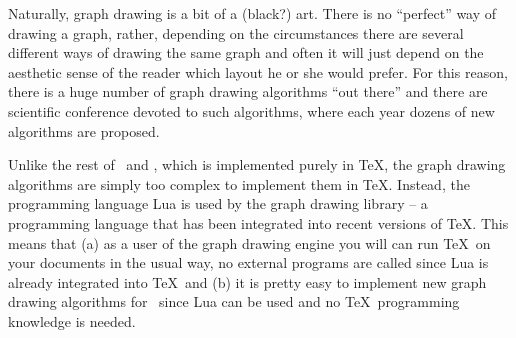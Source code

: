 Naturally, graph drawing is a bit of a (black?) art. There is no
``perfect'' way of drawing a graph, rather, depending on the
circumstances there are several different ways of drawing the same
graph and often it will just depend on the aesthetic sense of the
reader which layout he or she would prefer. For this reason, there is
a huge number of graph drawing algorithms ``out there'' and there are
scientific conference devoted to such algorithms, where each
year dozens of new algorithms are proposed.

Unlike the rest of \pgfname\ and \tikzname, which is implemented
purely in \TeX, the graph drawing algorithms are simply too complex to
implement them in \TeX. Instead, the programming language Lua is used
by the graph drawing library -- a programming language that has been
integrated into recent versions of \TeX. This means that (a) as a user
of the graph drawing engine you will can run \TeX\ on your documents
in the usual way, no external programs are called since Lua is already
integrated into \TeX\ and (b) it is pretty easy to implement new graph
drawing algorithms for \tikzname\ since Lua can be used and no \TeX\
programming knowledge is needed. 

